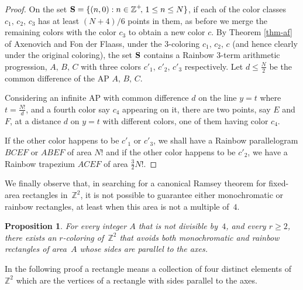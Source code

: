 \documentclass[a4paper, 11pt,reqno]{amsart}
\newtheorem{proposition}{Proposition}
\theoremstyle{definition}
\newcommand{\Z}{\mbox{${\mathbb Z}$}}
\begin{document}
\begin{proof}
On the set ${\bf S}= \{(n,0): n \in \Z^+\!,\, 1 \leq n \leq N\}$,
if each of the color classes  $c_1,\,c_2,\,c_3$  has at least $(N+4)/6$ points in  them, as before
we merge the remaining colors with the color $c_3$ to obtain a new color $c$.
By Theorem \ref{thm-af} of Axenovich and Fon der Flaass, under the $3$-coloring $c_1,\,c_2,\,c$ (and hence clearly under the
original coloring), the set ${\bf S}$  contains a Rainbow
$3$-term arithmetic progression, $A,\,B,\,C$ with three colors $c'_1,\,c'_2,\,c'_{3}$ respectively.
Let $d\leq \frac{N}{2}$ be the common difference of the AP $A,\,B,\,C$.

Considering an infinite AP with common difference $d$ on the line $y=t$ where $t=\frac{N!}{d}$,
and a fourth color say $c_4$ appearing on it,
there are two points, say $E$ and~$F$,  at a distance $d$ on $y=t$ with different colors,
one of them having color $c_4$.

If the other color happens to be $c'_1$ or $c'_3$, we shall have a Rainbow parallelogram $BCEF$ or $ABEF$
of area $N!$ and if the other color happens to be $c'_2$, we have a Rainbow trapezium $ACEF$ of area
$\frac{3}{2}N!$.
\end{proof}

\smallskip

We finally observe that, in searching for a canonical Ramsey theorem for fixed-area rectangles in~$\Z^2$,
it is not possible to guarantee either monochromatic or rainbow rectangles, at least when this area is not a multiple of~$4$.

\begin{proposition}
  For every integer $A$ that is not divisible by~$4$, and every $r\ge 2$,
  there exists an $r$-coloring of~$\Z^2$ that avoids
  both monochromatic and rainbow rectangles of area~$A$ whose sides
  are parallel to the axes.
\end{proposition}

In the following proof a rectangle means a collection of four distinct elements of~$\Z^2$
which are the vertices of a rectangle with sides parallel to the axes.
\end{document}
